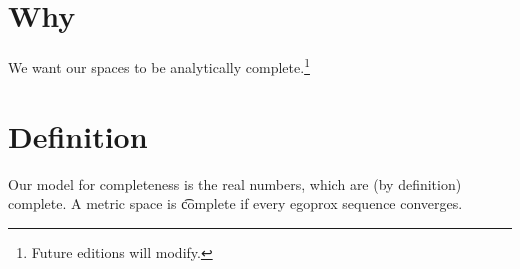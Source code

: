 
\section*{Why}

We want our spaces to be analytically complete.\footnote{Future editions will modify.}

\section*{Definition}

Our model for completeness is the real numbers, which are (by definition) complete.
A metric space is \t{complete} if every egoprox sequence converges.

\blankpage
